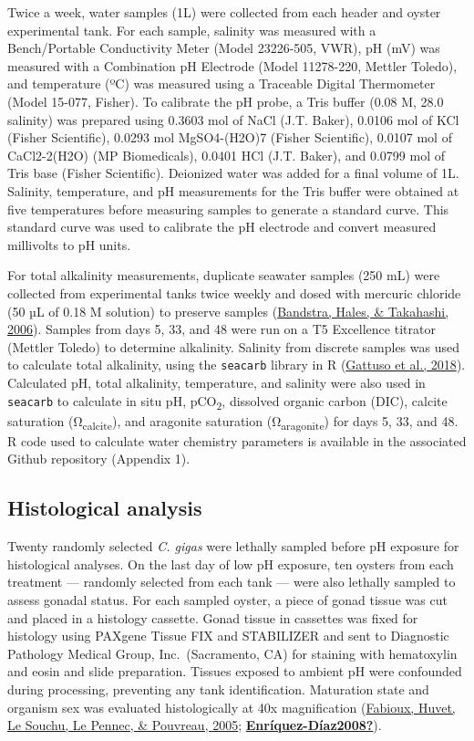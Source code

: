 \documentclass [11pt, proquest] {uwthesis}[2015/03/03]
\begin{document}
Twice a week, water samples (1L) were collected from each header and oyster experimental tank. For each sample, salinity was measured with a Bench/Portable Conductivity Meter (Model 23226-505, VWR), pH (mV) was measured with a Combination pH Electrode (Model 11278-220, Mettler Toledo), and temperature (ºC) was measured using a Traceable Digital Thermometer (Model 15-077, Fisher). To calibrate the pH probe, a Tris buffer (0.08 M, 28.0 salinity) was prepared using 0.3603 mol of NaCl (J.T. Baker), 0.0106 mol of KCl (Fisher Scientific), 0.0293 mol MgSO4-(H2O)7 (Fisher Scientific), 0.0107 mol of CaCl2-2(H2O) (MP Biomedicals), 0.0401 HCl (J.T. Baker), and 0.0799 mol of Tris base (Fisher Scientific). Deionized water was added for a final volume of 1L. Salinity, temperature, and pH measurements for the Tris buffer were obtained at five temperatures before measuring samples to generate a standard curve. This standard curve was used to calibrate the pH electrode and convert measured millivolts to pH units.

For total alkalinity measurements, duplicate seawater samples (250 mL) were collected from experimental tanks twice weekly and dosed with mercuric chloride (50 µL of 0.18 M solution) to preserve samples (\protect\hyperlink{ref-Bandstra2006}{Bandstra, Hales, \& Takahashi, 2006}). Samples from days 5, 33, and 48 were run on a T5 Excellence titrator (Mettler Toledo) to determine alkalinity. Salinity from discrete samples was used to calculate total alkalinity, using the \texttt{seacarb} library in R (\protect\hyperlink{ref-Gattuso2018}{Gattuso et al., 2018}). Calculated pH, total alkalinity, temperature, and salinity were also used in \texttt{seacarb} to calculate in situ pH, pCO\textsubscript{2}, dissolved organic carbon (DIC), calcite saturation (Ω\textsubscript{calcite}), and aragonite saturation (Ω\textsubscript{aragonite}) for days 5, 33, and 48. R code used to calculate water chemistry parameters is available in the associated Github repository (Appendix 1).

\hypertarget{histological-analysis}{%
\subsection{Histological analysis}\label{histological-analysis}}

Twenty randomly selected \emph{C. gigas} were lethally sampled before pH exposure for histological analyses. On the last day of low pH exposure, ten oysters from each treatment --- randomly selected from each tank --- were also lethally sampled to assess gonadal status. For each sampled oyster, a piece of gonad tissue was cut and placed in a histology cassette. Gonad tissue in cassettes was fixed for histology using PAXgene Tissue FIX and STABILIZER and sent to Diagnostic Pathology Medical Group, Inc.~(Sacramento, CA) for staining with hematoxylin and eosin and slide preparation. Tissues exposed to ambient pH were confounded during processing, preventing any tank identification. Maturation state and organism sex was evaluated histologically at 40x magnification (\protect\hyperlink{ref-Fabioux2005}{Fabioux, Huvet, Le Souchu, Le Pennec, \& Pouvreau, 2005}; \protect\hyperlink{ref-Enruxedquez-Duxedaz2008}{\textbf{Enríquez-Díaz2008?}}).
\end{document}
